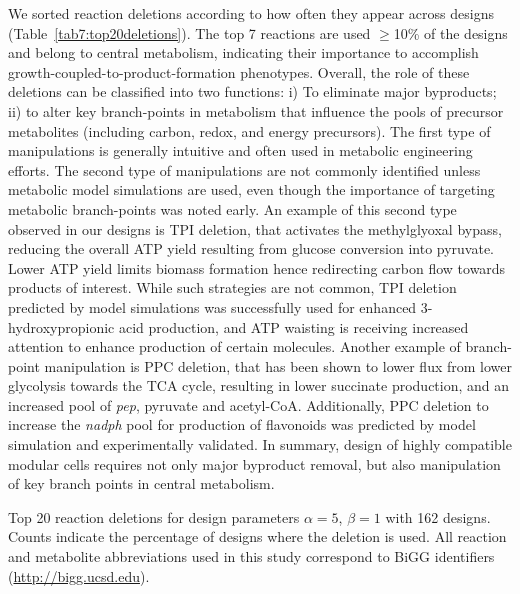 {We sorted reaction deletions according to how often they appear across designs (Table~\ref{tab7:top20deletions}).
The top 7 reactions are used $\ge$10\% of the designs and belong to central metabolism, indicating their importance to accomplish growth-coupled-to-product-formation phenotypes.
Overall, the role of these deletions can be classified into two functions: i) To eliminate major byproducts; ii) to alter key branch-points in metabolism that influence the pools of precursor metabolites (including carbon, redox, and energy precursors).
The first type of manipulations is generally intuitive and often used in metabolic engineering efforts.\citep{winkler2015}
The second type of manipulations are not commonly identified unless metabolic model simulations are used, \citep{tokuyama2014, venayak2018, chemler2010}
even though the importance of targeting metabolic branch-points was noted early. \citep{stephanopoulos1991}
An example of this second type observed in our designs is TPI deletion, that activates the methylglyoxal bypass,\citep{fong2006} reducing the overall ATP yield resulting from glucose conversion into pyruvate.
Lower ATP yield limits biomass formation hence redirecting carbon flow towards products of interest.
While such strategies are not common, TPI deletion predicted by model simulations was successfully used for enhanced 3-hydroxypropionic acid production,\citep{tokuyama2014} and ATP waisting is receiving increased attention to enhance production of certain molecules.\citep{boecker2019}
Another example of branch-point manipulation is PPC deletion, that has been shown to lower flux from lower glycolysis towards the TCA cycle,\citep{de2006,peng2004} resulting in lower succinate production, and an increased pool of \textit{pep}, pyruvate and acetyl-CoA.
Additionally, PPC deletion to increase the \textit{nadph} pool for production of flavonoids was predicted by model simulation and experimentally validated. \citep{chemler2010}
In summary, design of highly compatible modular cells requires not only major byproduct removal, but also manipulation of key branch points in central metabolism.

\begin{table}[h]
    \caption[Top 20 reaction deletions for design parameters $\alpha=5$, $\beta=1$]{Top 20 reaction deletions for design parameters $\alpha=5$, $\beta=1$ with 162 designs. Counts indicate the percentage of designs where the deletion is used. All reaction and metabolite abbreviations used in this study correspond to BiGG identifiers (\protect\url{http://bigg.ucsd.edu}).}
    \centering
    
    \label{tab7:top20deletions}
\end{table}


}
